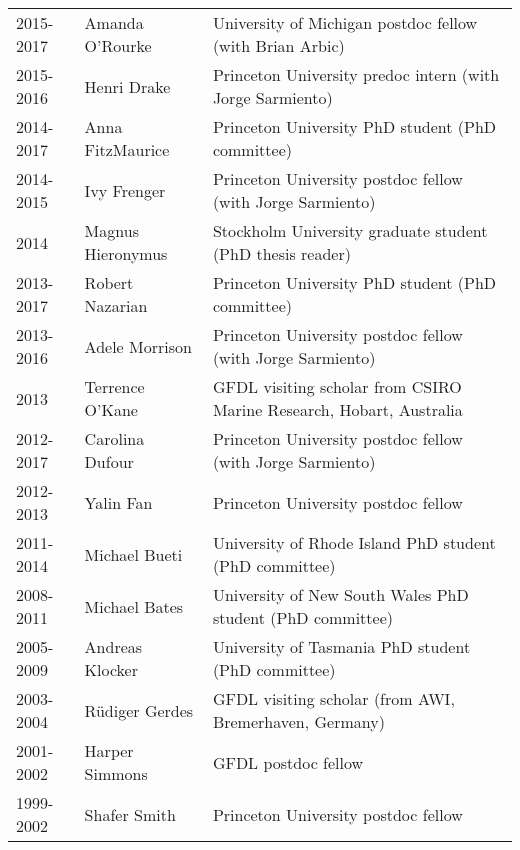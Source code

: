 \documentclass{article}
\begin{document}
\begin{tabular}{lll}
2015-2017 & Amanda O'Rourke  & University of Michigan postdoc fellow (with Brian Arbic) \\

2015-2016    & Henri Drake             & Princeton University predoc intern (with Jorge Sarmiento) \\

2014-2017 & Anna FitzMaurice   & Princeton University PhD student (PhD committee) \\ 

2014-2015     & Ivy Frenger            & Princeton University postdoc fellow (with Jorge Sarmiento) \\

2014 & Magnus Hieronymus& Stockholm University graduate student (PhD thesis reader) \\ 

2013-2017 & Robert Nazarian    & Princeton University PhD student (PhD committee) \\ 

2013-2016     & Adele Morrison     & Princeton University postdoc fellow (with Jorge Sarmiento) \\

2013               & Terrence O'Kane   & GFDL visiting scholar from CSIRO Marine Research, Hobart, Australia \\

2012-2017     & Carolina Dufour   & Princeton University postdoc fellow (with Jorge Sarmiento)  \\

2012-2013     & Yalin Fan              & Princeton University postdoc fellow  \\

2011-2014     & Michael Bueti       & University of Rhode Island  PhD student (PhD committee) \\

2008-2011     & Michael Bates       & University of New South Wales PhD student (PhD committee) \\

2005-2009     & Andreas Klocker   & University of Tasmania  PhD student (PhD committee) \\

2003-2004     & {R\"{u}diger} Gerdes  & GFDL visiting scholar (from AWI, Bremerhaven, Germany) \\

2001-2002     & Harper Simmons   & GFDL postdoc fellow \\

1999-2002     & Shafer Smith         & Princeton University postdoc fellow    
\end{tabular}
\end{document}
